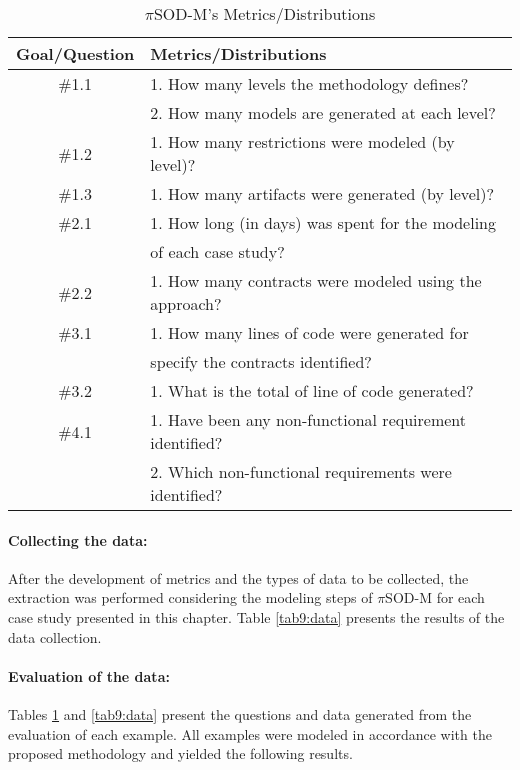 \documentclass[runningheads,a4paper]{llncs}
\begin{document}
\begin{table}
\centering
\caption{$\pi$SOD-M's Metrics/Distributions}
\label{tab8:metrics}

\begin{tabular}{|c|l|}

\hline 
\hline \textbf{Goal/Question} & \textbf{Metrics/Distributions} \\

\hline \#1.1 & 1. How many levels the methodology defines?  \\
& 2. How many models are generated at each level?\\
\hline \#1.2 & 1. How many restrictions were modeled (by level)?  \\
\hline \#1.3 & 1. How many artifacts were generated (by level)?  \\
\hline \#2.1 & 1. How long (in days) was spent for the modeling   \\
&  of each case study? \\
\hline \#2.2 & 1. How many contracts were modeled using the approach?  \\
\hline \#3.1 & 1. How many lines of code were generated for \\
& specify the contracts identified? \\

\hline \#3.2 & 1. What is the total of line of code generated? \\

\hline \#4.1 &  1. Have been any non-functional requirement identified?\\

 &  2. Which non-functional requirements were identified?\\

\hline
\hline

\hline


\end{tabular}

\end{table}


\paragraph{Collecting the data:} After the development of metrics and the types
of data to be collected, the extraction was performed considering the modeling
steps of $\pi$SOD-M for each case study presented in this chapter. Table
\ref{tab9:data} presents the results of the data collection.   

  
\paragraph{Evaluation of the data:} Tables \ref{tab8:metrics} and
\ref{tab9:data} present the questions and data generated from the evaluation of
each example. All examples were modeled in accordance with the proposed
methodology and yielded the following results.
\end{document}
